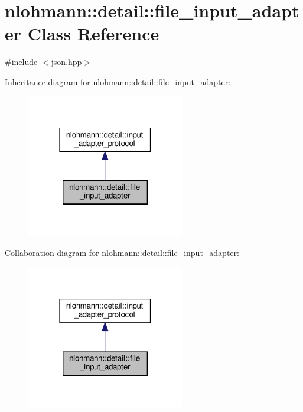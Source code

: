 \hypertarget{classnlohmann_1_1detail_1_1file__input__adapter}{}\section{nlohmann\+:\+:detail\+:\+:file\+\_\+input\+\_\+adapter Class Reference}
\label{classnlohmann_1_1detail_1_1file__input__adapter}


{\ttfamily \#include $<$json.\+hpp$>$}



Inheritance diagram for nlohmann\+:\+:detail\+:\+:file\+\_\+input\+\_\+adapter\+:\nopagebreak
\begin{figure}[H]
\begin{center}
\leavevmode
\includegraphics[width=195pt]{classnlohmann_1_1detail_1_1file__input__adapter__inherit__graph}
\end{center}
\end{figure}


Collaboration diagram for nlohmann\+:\+:detail\+:\+:file\+\_\+input\+\_\+adapter\+:\nopagebreak
\begin{figure}[H]
\begin{center}
\leavevmode
\includegraphics[width=195pt]{classnlohmann_1_1detail_1_1file__input__adapter__coll__graph}
\end{center}
\end{figure}

